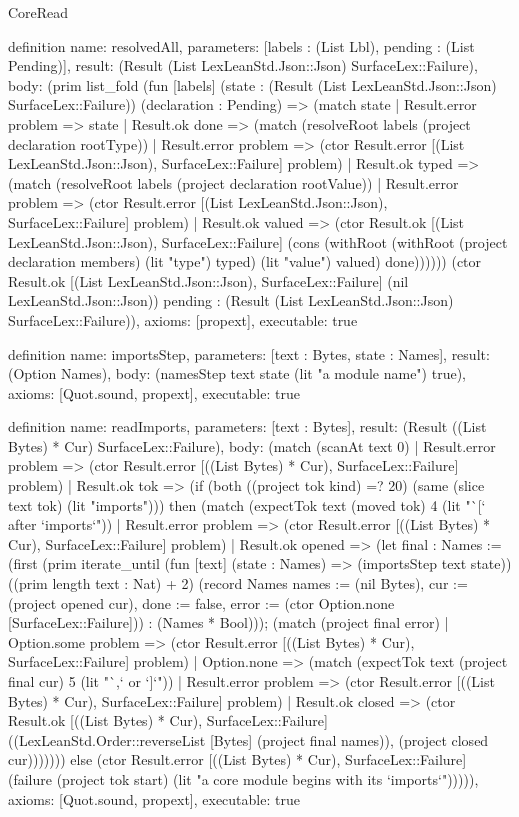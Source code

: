 \begin{lexlean}{CoreRead}
\begin{semanticmodule}
definition{
  name: resolvedAll,
  parameters: [labels : (List Lbl), pending : (List Pending)],
  result: (Result (List LexLeanStd.Json::Json) SurfaceLex::Failure),
  body: (prim list_fold (fun [labels] (state : (Result (List LexLeanStd.Json::Json) SurfaceLex::Failure)) (declaration : Pending) => (match state
    | Result.error problem => state
    | Result.ok done => (match (resolveRoot labels (project declaration rootType))
      | Result.error problem => (ctor Result.error [(List LexLeanStd.Json::Json), SurfaceLex::Failure] problem)
      | Result.ok typed => (match (resolveRoot labels (project declaration rootValue))
        | Result.error problem => (ctor Result.error [(List LexLeanStd.Json::Json), SurfaceLex::Failure] problem)
        | Result.ok valued => (ctor Result.ok [(List LexLeanStd.Json::Json), SurfaceLex::Failure] (cons (withRoot (withRoot (project declaration members) (lit "type") typed) (lit "value") valued) done)))))) (ctor Result.ok [(List LexLeanStd.Json::Json), SurfaceLex::Failure] (nil LexLeanStd.Json::Json)) pending : (Result (List LexLeanStd.Json::Json) SurfaceLex::Failure)),
  axioms: [propext],
  executable: true
}

definition{
  name: importsStep,
  parameters: [text : Bytes, state : Names],
  result: (Option Names),
  body: (namesStep text state (lit "a module name") true),
  axioms: [Quot.sound, propext],
  executable: true
}

definition{
  name: readImports,
  parameters: [text : Bytes],
  result: (Result ((List Bytes) * Cur) SurfaceLex::Failure),
  body: (match (scanAt text 0)
    | Result.error problem => (ctor Result.error [((List Bytes) * Cur), SurfaceLex::Failure] problem)
    | Result.ok tok => (if (both ((project tok kind) =? 20) (same (slice text tok) (lit "imports"))) then (match (expectTok text (moved tok) 4 (lit "`[` after `imports`"))
      | Result.error problem => (ctor Result.error [((List Bytes) * Cur), SurfaceLex::Failure] problem)
      | Result.ok opened => (let final : Names := (first (prim iterate_until (fun [text] (state : Names) => (importsStep text state)) ((prim length text : Nat) + 2) (record Names {names := (nil Bytes), cur := (project opened cur), done := false, error := (ctor Option.none [SurfaceLex::Failure])}) : (Names * Bool))); (match (project final error)
        | Option.some problem => (ctor Result.error [((List Bytes) * Cur), SurfaceLex::Failure] problem)
        | Option.none => (match (expectTok text (project final cur) 5 (lit "`,` or `]`"))
          | Result.error problem => (ctor Result.error [((List Bytes) * Cur), SurfaceLex::Failure] problem)
          | Result.ok closed => (ctor Result.ok [((List Bytes) * Cur), SurfaceLex::Failure] ((LexLeanStd.Order::reverseList [Bytes] (project final names)), (project closed cur))))))) else (ctor Result.error [((List Bytes) * Cur), SurfaceLex::Failure] (failure (project tok start) (lit "a core module begins with its `imports`"))))),
  axioms: [Quot.sound, propext],
  executable: true
}


\end{semanticmodule}
\end{lexlean}
